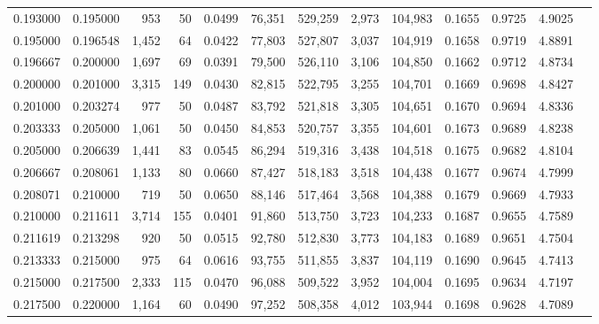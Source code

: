 \begin{tabular}{rrrrrrrrrrrrr}
0.193000 & 0.195000 &   953 &  50 &                                     0.0499 &  76,351 & 529,259 &   2,973 & 104,983 & 0.1655 & 0.9725 & 4.9025 \\
0.195000 & 0.196548 & 1,452 &  64 &                                     0.0422 &  77,803 & 527,807 &   3,037 & 104,919 & 0.1658 & 0.9719 & 4.8891 \\
0.196667 & 0.200000 & 1,697 &  69 &                                     0.0391 &  79,500 & 526,110 &   3,106 & 104,850 & 0.1662 & 0.9712 & 4.8734 \\
0.200000 & 0.201000 & 3,315 & 149 &                                     0.0430 &  82,815 & 522,795 &   3,255 & 104,701 & 0.1669 & 0.9698 & 4.8427 \\
0.201000 & 0.203274 &   977 &  50 &                                     0.0487 &  83,792 & 521,818 &   3,305 & 104,651 & 0.1670 & 0.9694 & 4.8336 \\
0.203333 & 0.205000 & 1,061 &  50 &                                     0.0450 &  84,853 & 520,757 &   3,355 & 104,601 & 0.1673 & 0.9689 & 4.8238 \\
0.205000 & 0.206639 & 1,441 &  83 &                                     0.0545 &  86,294 & 519,316 &   3,438 & 104,518 & 0.1675 & 0.9682 & 4.8104 \\
0.206667 & 0.208061 & 1,133 &  80 &                                     0.0660 &  87,427 & 518,183 &   3,518 & 104,438 & 0.1677 & 0.9674 & 4.7999 \\
0.208071 & 0.210000 &   719 &  50 &                                     0.0650 &  88,146 & 517,464 &   3,568 & 104,388 & 0.1679 & 0.9669 & 4.7933 \\
0.210000 & 0.211611 & 3,714 & 155 &                                     0.0401 &  91,860 & 513,750 &   3,723 & 104,233 & 0.1687 & 0.9655 & 4.7589 \\
0.211619 & 0.213298 &   920 &  50 &                                     0.0515 &  92,780 & 512,830 &   3,773 & 104,183 & 0.1689 & 0.9651 & 4.7504 \\
0.213333 & 0.215000 &   975 &  64 &                                     0.0616 &  93,755 & 511,855 &   3,837 & 104,119 & 0.1690 & 0.9645 & 4.7413 \\
0.215000 & 0.217500 & 2,333 & 115 &                                     0.0470 &  96,088 & 509,522 &   3,952 & 104,004 & 0.1695 & 0.9634 & 4.7197 \\
0.217500 & 0.220000 & 1,164 &  60 &                                     0.0490 &  97,252 & 508,358 &   4,012 & 103,944 & 0.1698 & 0.9628 & 4.7089 \\

\end{tabular}
